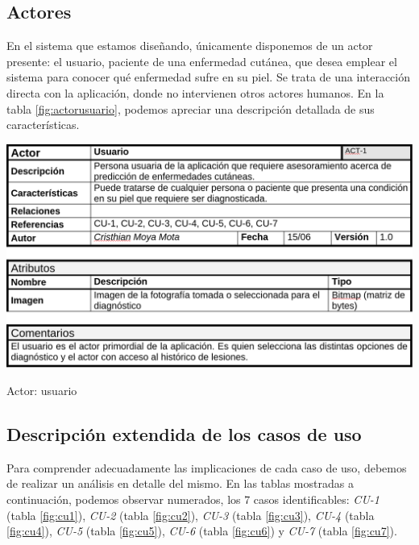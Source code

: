 \subsection{Actores}

En el sistema que estamos diseñando, únicamente disponemos de un actor presente: el usuario, paciente de una enfermedad cutánea, que desea emplear el sistema para conocer qué enfermedad sufre en su piel. Se trata de una interacción directa con la aplicación, donde no intervienen otros actores humanos. En la tabla \ref{fig:actorusuario}, podemos apreciar una descripción detallada de sus características.

  \begin{table}[H]
	\centering
	\includegraphics[scale = 0.2]{imagenes/tablausuario.png}
	\caption{Actor: usuario}
	\label{fig:actorusuario}
\end{table}

\subsection	{Descripción extendida de los casos de uso}

Para comprender adecuadamente las implicaciones de cada caso de uso, debemos de realizar un análisis en detalle del mismo. En las tablas mostradas a continuación, podemos observar numerados, los 7 casos identificables: \textit{CU-1} (tabla \ref{fig:cu1}), \textit{CU-2} (tabla \ref{fig:cu2}), \textit{CU-3} (tabla \ref{fig:cu3}), \textit{CU-4} (tabla \ref{fig:cu4}), \textit{CU-5} (tabla \ref{fig:cu5}), \textit{CU-6} (tabla \ref{fig:cu6}) y \textit{CU-7} (tabla \ref{fig:cu7}).

